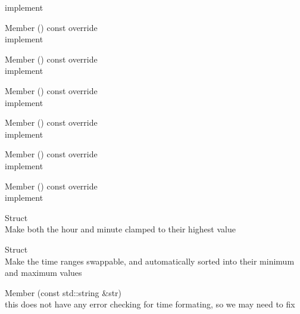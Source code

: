\begin{DoxyRefList}
%
implement  
\item[Member \doxylink{struct_w_e_p_1_1_paris_room_aa6e445f1475dfb6d5b0622d1c1cbbab8}{WEP\+::Paris\+Room\+::get\+Capacity} () const override]\hfill \\
\label{todo__todo000004}%
%
implement  
\item[Member \doxylink{struct_w_e_p_1_1_paris_room_a3b6efb6c6db2d062bca5678431f5cfb2}{WEP\+::Paris\+Room\+::get\+Cost} () const override]\hfill \\
\label{todo__todo000005}%
%
implement  
\item[Member \doxylink{struct_w_e_p_1_1_paris_room_ac11aae19de16d5ea540e716818809743}{WEP\+::Paris\+Room\+::get\+Name} () const override]\hfill \\
\label{todo__todo000003}%
%
implement  
\item[Member \doxylink{struct_w_e_p_1_1_rome_room_aa356e2cd211e2a90225ba4239fe8224b}{WEP\+::Rome\+Room\+::get\+Capacity} () const override]\hfill \\
\label{todo__todo000007}%
%
implement  
\item[Member \doxylink{struct_w_e_p_1_1_rome_room_a148345d77cb187c3d8f09f92ee950cc8}{WEP\+::Rome\+Room\+::get\+Cost} () const override]\hfill \\
\label{todo__todo000008}%
%
implement  
\item[Member \doxylink{struct_w_e_p_1_1_rome_room_a7b284f1834fef34b267493e4aae24f01}{WEP\+::Rome\+Room\+::get\+Name} () const override]\hfill \\
\label{todo__todo000006}%
%
implement  
\item[Struct \doxylink{struct_w_e_p_1_1_time}{WEP\+::Time} ]\hfill \\
\label{todo__todo000014}%
%
Make both the hour and minute clamped to their highest value  
\item[Struct \doxylink{struct_w_e_p_1_1_time_range}{WEP\+::Time\+Range} ]\hfill \\
\label{todo__todo000015}%
%
Make the time ranges swappable, and automatically sorted into their minimum and maximum values  
\item[Member \doxylink{struct_w_e_p_1_1_time_range_ae43b5e8a6376c804ba2fd5d3f73de1dd}{WEP\+::Time\+Range\+::from\+String} (const std\+::string \&str)]\hfill \\
\label{todo__todo000016}%
%
this does not have any error checking for time formating, so we may need to fix 
\end{DoxyRefList}